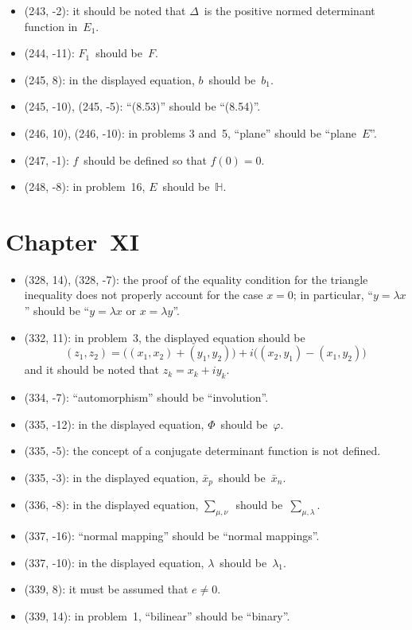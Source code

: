 \documentclass[letterpaper,12pt]{article}
\renewcommand{\H}{\mathbb{H}}
\newcommand{\iprod}[2]{(#1,#2)}
\begin{document}
\begin{itemize}
\item (243, -2): it should be noted that \(\Delta\)~is the positive normed determinant function in~\(E_1\).
\item (244, -11): \(F_1\)~should be~\(F\).
\item (245, 8): in the displayed equation, \(b\)~should be~\(b_1\).
\item (245, -10), (245, -5): ``(8.53)'' should be ``(8.54)''.
\item (246, 10), (246, -10): in problems 3 and~5, ``plane'' should be ``plane~\(E\)''.
\item (247, -1): \(f\)~should be defined so that \(f(0)=0\).
\item (248, -8): in problem~16, \(E\)~should be~\(\H\).
\end{itemize}

\section*{Chapter~XI}
\begin{itemize}
\item (328, 14), (328, -7): the proof of the equality condition for the triangle inequality does not properly account for the case \(x=0\); in particular, ``\(y=\lambda x\)'' should be ``\(y=\lambda x\) or \(x=\lambda y\)''.
\item (332, 11): in problem~3, the displayed equation should be
\[\iprod{z_1}{z_2}=\bigl(\iprod{x_1}{x_2}+\iprod{y_1}{y_2}\bigr)+i\bigl(\iprod{x_2}{y_1}-\iprod{x_1}{y_2}\bigr)\]
and it should be noted that \(z_k=x_k+iy_k\).
\item (334, -7): ``automorphism'' should be ``involution''.
\item (335, -12): in the displayed equation, \(\Phi\)~should be~\(\varphi\).
\item (335, -5): the concept of a conjugate determinant function is not defined.
\item (335, -3): in the displayed equation, \(\bar{x}_p\)~should be~\(\bar{x}_n\).
\item (336, -8): in the displayed equation, \(\displaystyle\sum_{\mu,\nu}\)~should be~\(\displaystyle\sum_{\mu,\lambda}\).
\item (337, -16): ``normal mapping'' should be ``normal mappings''.
\item (337, -10): in the displayed equation, \(\lambda\)~should be~\(\lambda_1\).
\item (339, 8): it must be assumed that \(e\ne 0\).
\item (339, 14): in problem~1, ``bilinear'' should be ``binary''.
\end{itemize}
\end{document}
